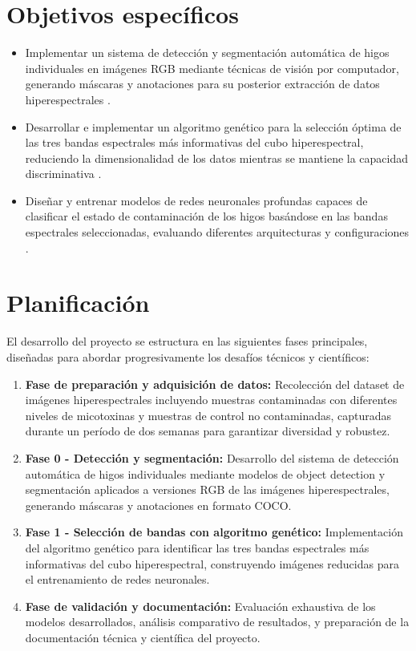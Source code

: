 \section{Objetivos específicos}
\begin{itemize}
    \item Implementar un sistema de detección y segmentación automática de higos individuales en imágenes RGB mediante técnicas de visión por computador, generando máscaras y anotaciones para su posterior extracción de datos hiperespectrales \cite{FERENTINOS2018311}.
    \item Desarrollar e implementar un algoritmo genético para la selección óptima de las tres bandas espectrales más informativas del cubo hiperespectral, reduciendo la dimensionalidad de los datos mientras se mantiene la capacidad discriminativa \cite{HONG201935}.
    \item Diseñar y entrenar modelos de redes neuronales profundas capaces de clasificar el estado de contaminación de los higos basándose en las bandas espectrales seleccionadas, evaluando diferentes arquitecturas y configuraciones \cite{PAOLETTI2019279, agriengineering6040225}.
\end{itemize}

\newpage
\section{Planificación}
El desarrollo del proyecto se estructura en las siguientes fases principales, diseñadas para abordar progresivamente los desafíos técnicos y científicos:

\begin{enumerate}
    \item \textbf{Fase de preparación y adquisición de datos:} Recolección del dataset de imágenes hiperespectrales incluyendo muestras contaminadas con diferentes niveles de micotoxinas y muestras de control no contaminadas, capturadas durante un período de dos semanas para garantizar diversidad y robustez.
    \item \textbf{Fase 0 - Detección y segmentación:} Desarrollo del sistema de detección automática de higos individuales mediante modelos de object detection y segmentación aplicados a versiones RGB de las imágenes hiperespectrales, generando máscaras y anotaciones en formato COCO.
    \item \textbf{Fase 1 - Selección de bandas con algoritmo genético:} Implementación del algoritmo genético para identificar las tres bandas espectrales más informativas del cubo hiperespectral, construyendo imágenes reducidas para el entrenamiento de redes neuronales.
    \item \textbf{Fase de validación y documentación:} Evaluación exhaustiva de los modelos desarrollados, análisis comparativo de resultados, y preparación de la documentación técnica y científica del proyecto.
\end{enumerate}


